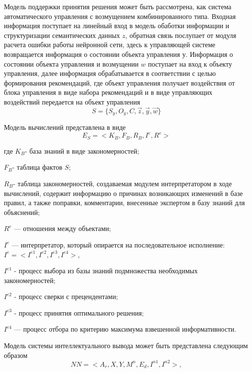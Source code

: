 Модель поддержки принятия решения может быть рассмотрена, как система автоматического управления с возмущением комбинированного типа. Входная информация поступает на линейный вход в модель обаботки информации и структуризации семантических данных ${z}$, обратная связь послупает от модуля расчета ошибки работы нейронной сети, здесь к управляющей системе возвращается информация о состоянии объекта управления ${у}$. Информация о состоянии объекта управления и возмущении ${w}$ поступает на вход к объекту управления, далее информация обрабатывается в соответствии с целью формирования рекомендаций, где объект управления получает воздействия от блока управления в виде набора рекомендаций и в виде управляющих воздействий передается на объект управления
\begin{equation}
    \label{eq:equation30}
    S = \{S_y, O_y, C,  \overrightarrow{z}, \overrightarrow{y}, \overrightarrow{w}\}
\end{equation}

Модель вычислений представлена в виде
\begin{equation}
    \label{eq:equation30}
    E_S=<K_B,F_B,R_B,I^e,R^e>
\end{equation}


где $K_B$- база знаний в виде закономерностей; 

$F_B$- таблица фактов $S$;

$R_B$- таблица закономерностей, создаваемая модулем интерпретатором в ходе вычислений, содержит информацию о причинах возникающих изменений в базе правил, а также поправки, комментарии, внесенные экспертом в базу знаний для объяснений; 

$R^e$ — отношения между объектами; 

$I^e$ — интерпретатор, который опирается на последовательное исполнение: $I^e =<I^{e1}, I^{e2}, I^{e3}, I^{e4}>$,

$I^{e1}$ - процесс выбора из базы знаний подмножества необходимых закономерностей; 

$I^{e2}$ - процесс сверки с прецендентами; 

$I^{e3}$ - процесс принятия оптимального решения; 

$I^{e4}$ — процесс отбора по критерию максимума взвешенной информативности.

Модель системы интеллектуального вывода может быть представлена следующим образом
\begin{equation}
    \label{eq:equation31}
    NN=<A_r,X,Y,M^n,E_d,I^{n1}, I^{n2} >,
\end{equation}

